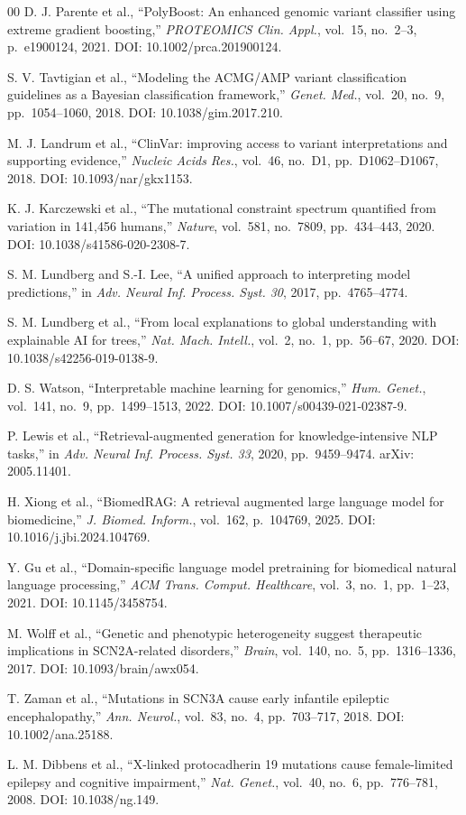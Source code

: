 \documentclass[conference]{IEEEtran}
\begin{document}
\begin{thebibliography}{00}
D. J. Parente et al., ``PolyBoost: An enhanced genomic variant classifier
using extreme gradient boosting,'' \textit{PROTEOMICS Clin. Appl.}, vol.~15,
no.~2--3, p.~e1900124, 2021. DOI: 10.1002/prca.201900124.

S. V. Tavtigian et al., ``Modeling the ACMG/AMP variant classification
guidelines as a Bayesian classification framework,'' \textit{Genet. Med.},
vol.~20, no.~9, pp.~1054--1060, 2018. DOI: 10.1038/gim.2017.210.

M. J. Landrum et al., ``ClinVar: improving access to variant interpretations
and supporting evidence,'' \textit{Nucleic Acids Res.}, vol.~46, no.~D1,
pp.~D1062--D1067, 2018. DOI: 10.1093/nar/gkx1153.

K. J. Karczewski et al., ``The mutational constraint spectrum quantified from
variation in 141,456 humans,'' \textit{Nature}, vol.~581, no.~7809,
pp.~434--443, 2020. DOI: 10.1038/s41586-020-2308-7.

S. M. Lundberg and S.-I. Lee, ``A unified approach to interpreting model
predictions,'' in \textit{Adv. Neural Inf. Process. Syst. 30}, 2017,
pp.~4765--4774.

S. M. Lundberg et al., ``From local explanations to global understanding with
explainable AI for trees,'' \textit{Nat. Mach. Intell.}, vol.~2, no.~1,
pp.~56--67, 2020. DOI: 10.1038/s42256-019-0138-9.

D. S. Watson, ``Interpretable machine learning for genomics,''
\textit{Hum. Genet.}, vol.~141, no.~9, pp.~1499--1513, 2022.
DOI: 10.1007/s00439-021-02387-9.

P. Lewis et al., ``Retrieval-augmented generation for knowledge-intensive NLP
tasks,'' in \textit{Adv. Neural Inf. Process. Syst. 33}, 2020,
pp.~9459--9474. arXiv: 2005.11401.

H. Xiong et al., ``BiomedRAG: A retrieval augmented large language model for
biomedicine,'' \textit{J. Biomed. Inform.}, vol.~162, p.~104769, 2025.
DOI: 10.1016/j.jbi.2024.104769.

Y. Gu et al., ``Domain-specific language model pretraining for biomedical
natural language processing,'' \textit{ACM Trans. Comput. Healthcare},
vol.~3, no.~1, pp.~1--23, 2021. DOI: 10.1145/3458754.

M. Wolff et al., ``Genetic and phenotypic heterogeneity suggest therapeutic
implications in SCN2A-related disorders,'' \textit{Brain}, vol.~140, no.~5,
pp.~1316--1336, 2017. DOI: 10.1093/brain/awx054.

T. Zaman et al., ``Mutations in SCN3A cause early infantile epileptic
encephalopathy,'' \textit{Ann. Neurol.}, vol.~83, no.~4, pp.~703--717, 2018.
DOI: 10.1002/ana.25188.

L. M. Dibbens et al., ``X-linked protocadherin 19 mutations cause
female-limited epilepsy and cognitive impairment,'' \textit{Nat. Genet.},
vol.~40, no.~6, pp.~776--781, 2008. DOI: 10.1038/ng.149.

\end{thebibliography}
\end{document}
